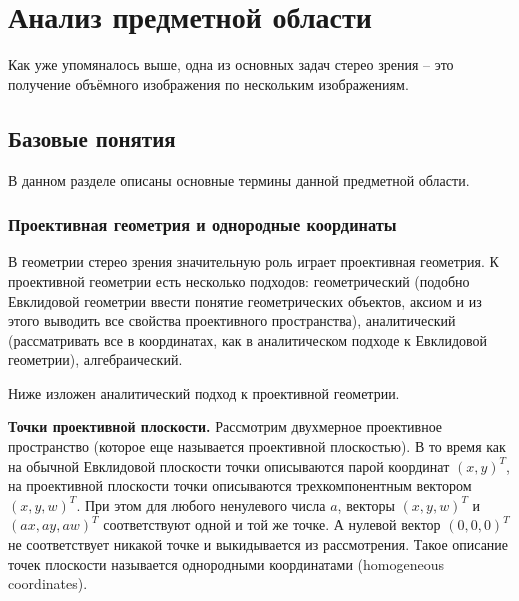 \chapter{Анализ предметной области}
Как уже упомяналось выше, одна из основных задач стерео зрения -- это получение объёмного изображения по нескольким изображениям.

\section{Базовые понятия}
В данном разделе описаны основные термины данной предметной области.



\subsection{Проективная геометрия и однородные координаты}
В геометрии стерео зрения значительную роль играет проективная геометрия. К проективной геометрии есть несколько подходов: геометрический (подобно Евклидовой геометрии ввести понятие геометрических объектов, аксиом и из этого выводить все свойства проективного пространства), аналитический (рассматривать все в координатах, как в аналитическом подходе к Евклидовой геометрии), алгебраический.

Ниже изложен аналитический подход к проективной геометрии.

\textbf{Точки проективной плоскости.} Рассмотрим двухмерное проективное пространство (которое еще называется проективной плоскостью). В то время как на обычной Евклидовой плоскости точки описываются парой координат $(x,y)^T$, на проективной плоскости точки описываются трехкомпонентным вектором $(x,y,w)^T$. При этом для любого ненулевого числа $a$, векторы $(x,y,w)^T$ и $(ax, ay, aw)^T$ соответствуют одной и той же точке. А нулевой вектор $(0,0,0)^T$ не соответствует никакой точке и выкидывается из рассмотрения. Такое описание точек плоскости называется однородными координатами (homogeneous coordinates).


